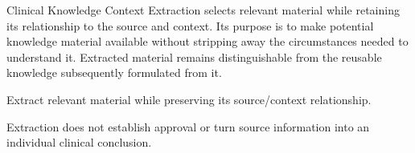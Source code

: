Clinical Knowledge Context Extraction selects relevant material while retaining its relationship to the source and context. Its purpose is to make potential knowledge material available without stripping away the circumstances needed to understand it. Extracted material remains distinguishable from the reusable knowledge subsequently formulated from it.



Extract relevant material while preserving its source/\allowbreak{}context relationship.



Extraction does not establish approval or turn source information into an individual clinical conclusion.


